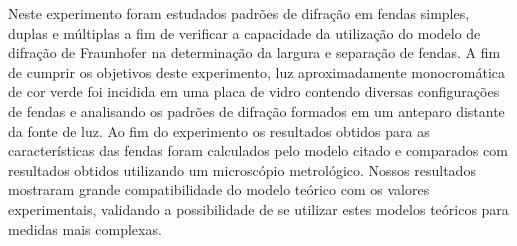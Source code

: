 Neste experimento foram estudados padrões de difração em fendas simples, duplas e múltiplas a fim de verificar a capacidade da utilização do modelo de difração de Fraunhofer na determinação da largura e separação de fendas. A fim de cumprir os objetivos deste experimento, luz aproximadamente monocromática de cor verde foi incidida em uma placa de vidro contendo diversas configurações de fendas e analisando os padrões de difração formados em um anteparo distante da fonte de luz. Ao fim do experimento os resultados obtidos para as características das fendas foram calculados pelo modelo citado e comparados com resultados obtidos utilizando um microscópio metrológico. Nossos resultados mostraram grande compatibilidade do modelo teórico com os valores experimentais, validando a possibilidade de se utilizar estes modelos teóricos para medidas mais complexas.
